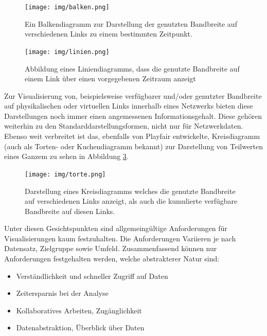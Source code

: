 \documentclass[draft=false
              ,paper=a4
              ,twoside=false
              ,fontsize=11pt
              ,headsepline
              ,BCOR10mm
              ,DIV11
              ]{scrbook}
\newcommand{\TODO}[1]{\colorbox{yellow}{\textcolor{red}{[TODO: #1]}}}
\begin{document}
\begin{figure}[htbp]
  \centering
  \texttt{[image: img/balken.png]}
  \caption{Ein Balkendiagramm zur Darstellung der genutzten Bandbreite auf verschiedenen Links zu einem bestimmten Zeitpunkt.}
  \label{fig:balken}
\end{figure}

\begin{figure}[htbp]
  \centering
  \texttt{[image: img/linien.png]}
  \caption{Abbildung eines Liniendiagramms, dass die genutzte Bandbreite auf einem Link über einen vorgegebenen Zeitraum anzeigt}
  \label{fig:linien}
\end{figure}

Zur Visualisierung von, beispielsweise verfügbarer und/oder genutzter Bandbreite auf physikalischen oder virtuellen Links innerhalb eines Netzwerks bieten diese Darstellungen noch immer einen angemessenen Informationsgehalt. Diese gehören weiterhin zu den Standarddarstellungsformen, nicht nur für Netzwerkdaten. Ebenso weit verbreitet ist das, ebenfalls von Playfair entwickelte, Kreisdiagramm (auch als Torten- oder Kuchendiagramm bekannt) zur Darstellung von Teilwerten eines Ganzem zu sehen in Abbildung \ref{fig:kreis}.

\begin{figure}[htbp]
  \centering
  \texttt{[image: img/torte.png]}
  \caption{Darstellung eines Kreisdiagramms welches die genutzte Bandbreite auf verschiedenen Links anzeigt, als auch die kumulierte verfügbare Bandbreite auf diesen Links.}
  \label{fig:kreis}
\end{figure}


Unter diesen Gesichtspunkten sind allgemeingültige Anforderungen für Visualisierungen kaum festzuhalten. Die Anforderungen Variieren je nach Datensatz, Zielgruppe sowie Umfeld. Zusammenfassend können nur Anforderungen festgehalten werden, welche abstrakterer Natur sind:

\begin{itemize}
  \item Verständlichkeit und schneller Zugriff auf Daten
  \item Zeitersparnis bei der Analyse
  \item Kollaboratives Arbeiten, Zugänglichkeit
  \item Datenabstraktion, Überblick über Daten
\end{itemize}
\end{document}
